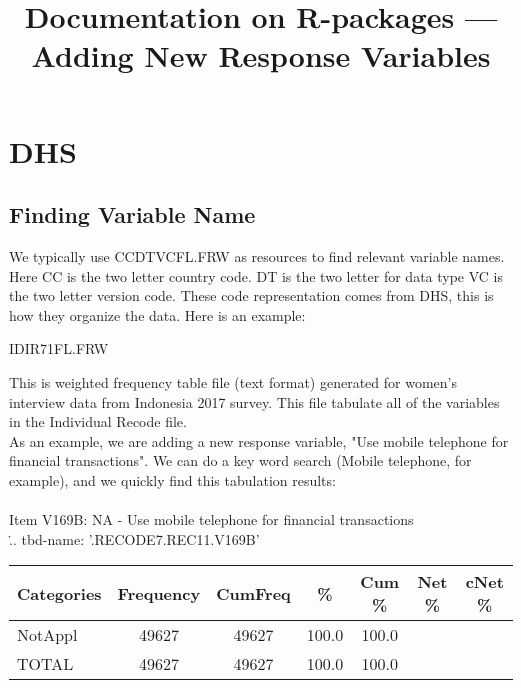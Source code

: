 \documentclass[12pt]{article}
\begin{document}
\title{Documentation on R-packages --- Adding New Response Variables}
\maketitle

\section{DHS}
\subsection{Finding Variable Name}
We typically use CCDTVCFL.FRW as resources to find relevant variable names. Here CC is the two letter country code. DT is the two letter for data type VC is the two letter version code. These code representation comes from DHS, this is how they organize the data. Here is an example:

IDIR71FL.FRW

This is weighted frequency table file (text format) generated for women's interview data from Indonesia 2017 survey. This file tabulate all of the variables in the Individual Recode file. \\

As an example, we are adding a new response variable, "Use mobile telephone for financial transactions". We can do a key word search (Mobile telephone, for example), and we quickly find this tabulation results:\\
\\
Item V169B: NA - Use mobile telephone for financial transactions \\
\... tbd-name: '.RECODE7.REC11.V169B' \\
{\small 
\begin{tabular}{lcccccc}
\hline
Categories & Frequency  &  CumFreq & \%  & Cum \% & Net \% & cNet \% \\
\hline
NotAppl & 49627  &  49627  &  100.0  & 100.0  &   &  \\
\hline
TOTAL & 49627 &  49627 &  100.0 & 100.0 & & \\
\end{tabular}
}
\end{document}

